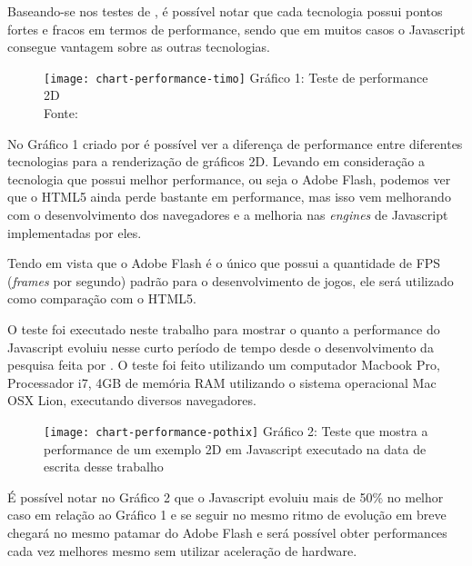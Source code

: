 Baseando-se nos testes de , é possível notar que
cada tecnologia possui pontos fortes e fracos em termos de performance, sendo que
em muitos casos o Javascript consegue vantagem sobre as outras tecnologias.

\begin{figure}[H]
  \centering
	\texttt{[image: chart-performance-timo]}
	\footnotesize\hspace{8\baselineskip}
	Gráfico 1: Teste de performance 2D \\
	Fonte: \cite{performanceria}
  \label{img:chart-performance-timo}
\end{figure}

No Gráfico 1 criado por  é
possível ver a diferença de performance entre diferentes tecnologias para a
renderização de gráficos 2D.
Levando em consideração a tecnologia que possui melhor performance,
ou seja o Adobe Flash, podemos ver que o HTML5 ainda perde bastante em performance,
mas isso vem melhorando com o desenvolvimento dos navegadores e a melhoria nas
\textit{engines} de Javascript implementadas por eles.

Tendo em vista que o Adobe Flash é o único que possui a quantidade de FPS
(\textit{frames} por segundo) padrão para o desenvolvimento de jogos,
ele será utilizado como comparação com o HTML5.

O teste foi executado neste trabalho para mostrar o quanto a performance do Javascript evoluiu nesse curto
período de tempo desde o desenvolvimento da pesquisa feita por
. O teste foi feito utilizando um
computador Macbook Pro, Processador i7, 4GB de memória RAM utilizando o sistema
operacional Mac OSX Lion, executando diversos navegadores.

\begin{figure}[H]
  \centering
	\texttt{[image: chart-performance-pothix]}
	\footnotesize\hspace{8\baselineskip}
	Gráfico 2: Teste que mostra a performance de um exemplo 2D em Javascript executado na data de escrita desse trabalho
  \label{img:chart-performance-pothix}
\end{figure}

É possível notar no Gráfico 2 que o
Javascript evoluiu mais de 50\% no melhor caso
em relação ao Gráfico 1 e se seguir no mesmo ritmo de evolução
em breve chegará no mesmo patamar do Adobe Flash e será possível obter performances cada
vez melhores mesmo sem utilizar aceleração de hardware.

